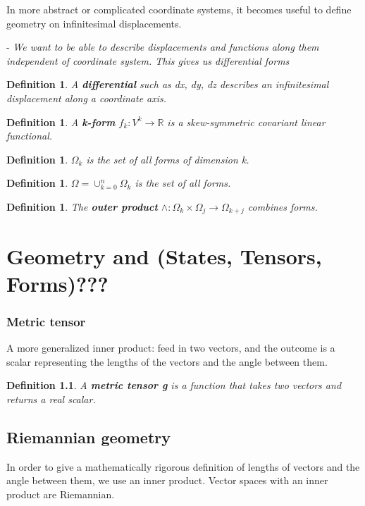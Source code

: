 \documentclass{book}
\newtheorem{defn}[equation]{Definition}
\begin{document}
In more abstract or complicated coordinate systems, it becomes useful to define geometry on infinitesimal displacements. 

- \emph{We want to be able to describe displacements and functions along them independent of coordinate system. This gives us differential forms}


\begin{defn}
	A \textbf{differential} such as dx, dy, dz describes an infinitesimal displacement along a coordinate axis. 
\end{defn}

\begin{defn}
	A \textbf{k-form} $f_k : V^k \to \mathbb{R}$ is a skew-symmetric covariant linear functional. 
\end{defn}

\begin{defn}
	$\Omega_k$ is the set of all forms of dimension k. 
\end{defn}

\begin{defn}
	$\Omega = \cup_{k=0}^n\Omega_k$ is the set of all forms. 
\end{defn}



\begin{defn}
	
	The \textbf{outer product} $\wedge : \Omega_k \times \Omega_j \to \Omega_{k+j}$ combines forms. 
\end{defn}





\chapter{Geometry and (States, Tensors, Forms)???}


\subsection{Metric tensor}
A more generalized inner product: feed in two vectors, and the outcome is a scalar representing the lengths of the vectors and the angle between them. 

\begin{defn}
	A \textbf{metric tensor g} is a function that takes two vectors and returns a real scalar. 
\end{defn}


\section{Riemannian geometry}
In order to give a mathematically rigorous definition of lengths of vectors and the angle between them, we use an inner product. Vector spaces with an inner product are Riemannian.
\end{document}
